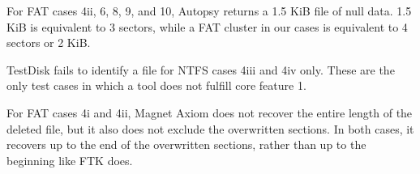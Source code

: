 For FAT cases 4ii, 6, 8, 9, and 10, Autopsy returns a 1.5 KiB file of null data.
1.5 KiB is equivalent to 3 sectors, while a FAT cluster in our cases is equivalent to 4 sectors or 2 KiB.

TestDisk fails to identify a file for NTFS cases 4iii and 4iv only. 
These are the only test cases in which a tool does not fulfill core feature 1.

For FAT cases 4i and 4ii, Magnet Axiom does not recover the entire length of the deleted file, but it also does not exclude the overwritten sections. 
In both cases, it recovers up to the end of the overwritten sections, rather than up to the beginning like FTK does.
